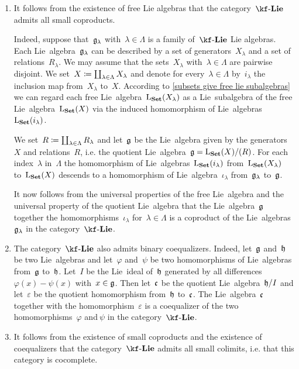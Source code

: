 \begin{remark}
	\label{existence of small colimits}
	\leavevmode
	\begin{enumerate}
		\item
			It follows from the existence of free Lie algebras that the category~$\cLie{\kf}$ admits all small coproducts.

			Indeed, suppose that~$\mathfrak{g}_\lambda$ with~$\lambda \in \Lambda$ is a family of~$\cLie{\kf}$ Lie algebras.
			Each Lie~algebra~$\mathfrak{g}_\lambda$ can be described by a set of generators~$X_\lambda$ and a set of relations~$R_\lambda$.
			We may assume that the sets~$X_\lambda$ with~$\lambda \in \Lambda$ are pairwise disjoint.
			We set~$X \coloneqq \coprod_{\lambda \in \Lambda} X_\lambda$ and denote for every~$\lambda \in \Lambda$ by~$i_\lambda$ the inclusion map from~$X_\lambda$ to~$X$.
			According to \cref{subsets give free lie subalgebras} we can regard each free Lie~algebra~$\operatorname{L}_{\mathbf{Set}}(X_\lambda)$ as a Lie~subalgebra of the free Lie~algebra~$\operatorname{L}_{\mathbf{Set}}(X)$ via the induced homomorphism of Lie~algebras~$\operatorname{L}_{\mathbf{Set}}(i_\lambda)$.

			We set~$R \coloneqq \coprod_{\lambda \in \Lambda} R_\lambda$ and let~$\mathfrak{g}$ be the Lie~algebra given by the generators~$X$ and relations~$R$, i.e. the quotient Lie~algebra~$\mathfrak{g} = \operatorname{L}_{\mathbf{Set}}(X) / \lparen R \rparen$.
			For each index~$\lambda$ in~$\Lambda$ the homomorphism of Lie~algebras~$\operatorname{L}_{\mathbf{Set}}(i_\lambda)$ from~$\operatorname{L}_{\mathbf{Set}}(X_\lambda)$ to~$\operatorname{L}_{\mathbf{Set}}(X)$ descends to a homomorphism of Lie~algebra~$\iota_\lambda$ from~$\mathfrak{g}_\lambda$ to~$\mathfrak{g}$.

			It now follows from the universal properties of the free Lie~algebra and the universal property of the quotient Lie~algebra that the Lie~algebra~$\mathfrak{g}$ together the homomorphisms~$\iota_\lambda$ for~$\lambda \in \Lambda$ is a coproduct of the Lie~algebras~$\mathfrak{g}_\lambda$ in the category~$\cLie{\kf}$.
		\item
			The category~$\cLie{\kf}$ also admits binary coequalizers.
			Indeed, let~$\mathfrak{g}$ and~$\mathfrak{h}$ be two Lie~algebras and let~$\varphi$ and~$\psi$ be two homomorphisms of Lie~algebras from~$\mathfrak{g}$ to~$\mathfrak{h}$.
			Let~$I$ be the Lie~ideal of~$\mathfrak{h}$ generated by all differences~$\varphi(x) - \psi(x)$ with~$x \in \mathfrak{g}$.
			Then let~$\mathfrak{c}$ be the quotient Lie~algebra~$\mathfrak{h} / I$ and let~$\varepsilon$ be the quotient homomorphism from~$\mathfrak{h}$ to~$\mathfrak{c}$.
			The Lie~algebra~$\mathfrak{c}$ together with the homomorphism~$\varepsilon$ is a coequalizer of the two homomorphisms~$\varphi$ and$~\psi$ in the category~$\cLie{\kf}$.
		\item
			It follows from the existence of small coproducts and the existence of coequalizers that the category~$\cLie{\kf}$ admits all small colimits, i.e. that this category is cocomplete.
	\end{enumerate}
\end{remark}





